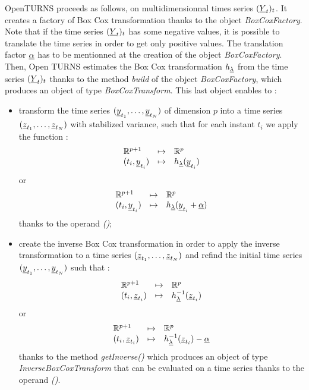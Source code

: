 OpenTURNS proceeds as follows, on multidimensionnal times series $({\underline{Y}}_t)_t$. It creates a factory of Box Cox transformation  thanks to the  object \emph{BoxCoxFactory}. Note that if the time series  $({\underline{Y}}_t)_t$ has some negative values, it is possible to translate the time series in order to get only positive values. The translation factor ${\underline{\alpha}}$ has to be mentionned at the creation of the object {\itshape BoxCoxFactory}.\\
Then, Open TURNS estimates the Box Cox transformation $h_{{\underline{\lambda}}}$ from  the time series $({\underline{Y}}_t)_t$  thanks to the method \emph{build} of the object \emph{BoxCoxFactory}, which produces an object of type \emph{BoxCoxTransform}. This last object enables to :
\begin{itemize}
  \item  transform the time series  $({\underline{y}}_{t_1}, \dots,{\underline{y}}_{t_N})$ of dimension $p$ into a time series $({\underline{z}}_{t_1}, \dots,{\underline{z}}_{t_N})$  with stabilized variance, such that for each instant $t_i$ we apply the function : 
\begin{equation}
\begin{array}{lcl}\label{Eval}
  \mathbb{R}^{p+1} & \mapsto & \mathbb{R}^{p} \\
  (t_i,{\underline{y}}_{t_i}) & \mapsto & h_{{\underline{\lambda}}}({\underline{y}}_{t_i})
\end{array}
\end{equation}
or 
\begin{equation}
\begin{array}{lcl}\label{Eval}
  \mathbb{R}^{p+1} & \mapsto & \mathbb{R}^{p} \\
  (t_i,{\underline{y}}_{t_i})  & \mapsto & h_{{\underline{\lambda}}}({\underline{y}}_{t_i} + {\underline{\alpha}})
\end{array}
\end{equation}
thanks to the operand  \emph{()};
  \item create the inverse Box Cox transformation  in order to apply the inverse transformation to a time series $({\underline{z}}_{t_1}, \dots,{\underline{z}}_{t_N})$ and refind the initial time series $({\underline{y}}_{t_1}, \dots,{\underline{y}}_{t_N})$ such that :
\begin{equation}
\begin{array}{lcl}\label{Inverse}
  \mathbb{R}^{p+1} & \mapsto & \mathbb{R}^{p} \\
  (t_i,{\underline{z}}_{t_i}) & \mapsto & h^{-1}_{{\underline{\lambda}}}({\underline{z}}_{t_i} )
\end{array}
\end{equation}
or 
\begin{equation}
\begin{array}{lcl}\label{Eval}
  \mathbb{R}^{p+1} & \mapsto & \mathbb{R}^{p} \\
  (t_i,{\underline{z}}_{t_i}) & \mapsto & h^{-1}_{{\underline{\lambda}}}({\underline{z}}_{t_i} ) - {\underline{\alpha}}
\end{array}
\end{equation}
thanks to the method \emph{getInverse()} which produces an object of type \emph{InverseBoxCoxTransform} that can be evaluated on a time series thanks to the operand  \emph{()}. 
\end{itemize}



